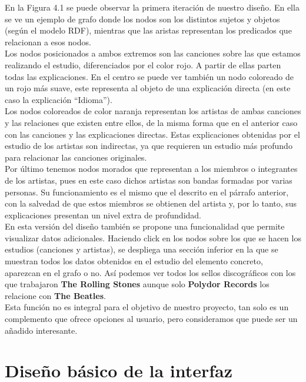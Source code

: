 En la Figura 4.1 se puede observar la primera iteración de nuestro diseño. En ella se ve un ejemplo de grafo donde los nodos son los distintos sujetos y objetos (según el modelo RDF), mientras que las aristas representan los predicados que relacionan a esos nodos.\\

Los nodos posicionados a ambos extremos son las canciones sobre las que estamos realizando el estudio, diferenciados por el color rojo. A partir de ellas parten todas las explicaciones. En el centro se puede ver también un nodo coloreado de un rojo más suave, este representa al objeto de una explicación directa (en este caso la explicación ``Idioma'').\\

Los nodos coloreados de color naranja representan los artistas de ambas canciones y las relaciones que existen entre ellos, de la misma forma que en el anterior caso con las canciones y las explicaciones directas. Estas explicaciones obtenidas por el estudio de los artistas son indirectas, ya que requieren un estudio más profundo para relacionar las canciones originales.\\

Por último tenemos nodos morados que representan a los miembros o integrantes de los artistas, pues en este caso dichos artistas son bandas formadas por varias personas. Su funcionamiento es el mismo que el descrito en el párrafo anterior, con la salvedad de que estos miembros se obtienen del artista y, por lo tanto, sus explicaciones presentan un nivel extra de profundidad.\\

En esta versión del diseño también se propone una funcionalidad que permite visualizar datos adicionales. Haciendo click en los nodos sobre los que se hacen los estudios (canciones y artistas), se despliega una sección inferior en la que se muestran todos los datos obtenidos en el estudio del elemento concreto, aparezcan en el grafo o no. Así podemos ver todos los sellos discográficos con los que trabajaron \textbf{The Rolling Stones} aunque solo \textbf{Polydor Records} los relacione con \textbf{The Beatles}.\\

Esta función no es integral para el objetivo de nuestro proyecto, tan solo es un complemento que ofrece opciones al usuario, pero consideramos que puede ser un añadido interesante.\\

\section{Diseño básico de la interfaz}

